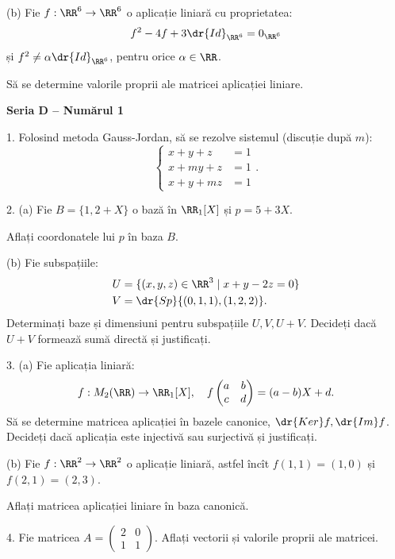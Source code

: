(b) Fie $ f : \RR^6 \to \RR^6 $ o aplicație liniară cu proprietatea:
\[
  f^2 - 4f + 3 \dr{Id}_{\RR^6} = 0_{\RR^6}
\]
și $ f^2 \neq \alpha \dr{Id}_{\RR^6} $, pentru orice $ \alpha \in \RR $.

Să se determine valorile proprii ale matricei aplicației liniare.

\newpage

\textbf{Seria D -- Numărul 1}

1. Folosind metoda Gauss-Jordan, să se rezolve sistemul (discuție după $ m $):
\[
  \begin{cases}
    x + y + z &= 1 \\
    x + my + z &= 1 \\
    x + y + mz &= 1
  \end{cases}.
\]

\vspace{0.5cm}

2. (a) Fie $ B = \{ 1, 2 + X \} $ o bază în $ \RR_1[X] $ și $ p = 5 + 3X $.

Aflați coordonatele lui $ p $ în baza $ B $.

(b) Fie subspațiile:
\begin{align*}
  U &= \{ (x, y, z) \in \RR^3 \mid x + y - 2z = 0 \} \\
  V &= \dr{Sp} \{(0, 1, 1), (1, 2, 2) \}.
\end{align*}
Determinați baze și dimensiuni pentru subspațiile $ U, V, U + V $. Decideți
dacă $ U + V $ formează sumă directă și justificați.

\vspace{0.5cm}

3. (a) Fie aplicația liniară:
\[
  f: M_2(\RR) \to \RR_1[X], \quad f \begin{pmatrix} a & b \\ c & d \end{pmatrix} = (a - b) X + d.
\]
Să se determine matricea aplicației în bazele canonice, $ \dr{Ker}f, \dr{Im}f $. Decideți
dacă aplicația este injectivă sau surjectivă și justificați.

(b) Fie $ f : \RR^2 \to \RR^2 $ o aplicație liniară, astfel încît $ f(1, 1) = (1, 0) $
și $ f(2, 1) = (2, 3) $.

Aflați matricea aplicației liniare în baza canonică.

\vspace{0.5cm}

4. Fie matricea $ A = \begin{pmatrix} 2 & 0 \\ 1 & 1 \end{pmatrix} $. Aflați
vectorii și valorile proprii ale matricei.


